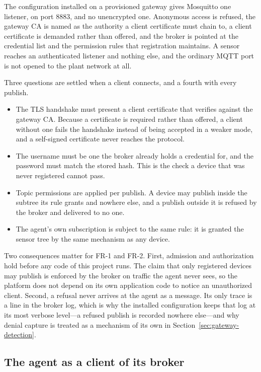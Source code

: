 \documentclass[12pt,a4paper]{report}
\begin{document}
The configuration installed on a provisioned gateway gives Mosquitto
one listener, on port 8883, and no unencrypted one. Anonymous access
is refused, the gateway CA is named as the authority a client
certificate must chain to, a client certificate is demanded rather
than offered, and the broker is pointed at the credential list and
the permission rules that registration maintains. A sensor reaches
an authenticated listener and nothing else, and the ordinary MQTT
port is not opened to the plant network at all.

Three questions are settled when a client connects, and a fourth
with every publish.

\begin{itemize}
    \item The TLS handshake must present a client certificate that
    verifies against the gateway CA. Because a certificate is
    required rather than offered, a client without one fails the
    handshake instead of being accepted in a weaker mode, and a
    self-signed certificate never reaches the protocol.
    \item The username must be one the broker already holds a
    credential for, and the password must match the stored hash.
    This is the check a device that was never registered cannot
    pass.
    \item Topic permissions are applied per publish. A device may
    publish inside the subtree its rule grants and nowhere else, and
    a publish outside it is refused by the broker and delivered to
    no one.
    \item The agent's own subscription is subject to the same rule:
    it is granted the sensor tree by the same mechanism as any
    device.
\end{itemize}

Two consequences matter for FR-1 and FR-2. First, admission and
authorization hold before any code of this project runs. The claim
that only registered devices may publish is enforced by the broker
on traffic the agent never sees, so the platform does not depend on
its own application code to notice an unauthorized client. Second, a
refusal never arrives at the agent as a message. Its only trace is a
line in the broker log, which is why the installed configuration
keeps that log at its most verbose level---a refused publish is
recorded nowhere else---and why denial capture is treated as a
mechanism of its own in
Section~\ref{sec:gateway-detection}.

\subsection{The agent as a client of its broker}
\label{sec:gw-agent-client}
\end{document}
